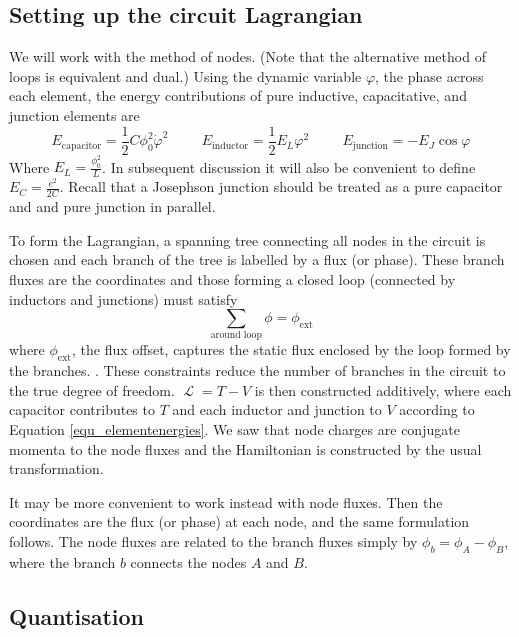 \documentclass[11pt]{article}
\DeclareMathOperator{\lagr}{\mathcal{L}}
\begin{document}
\subsection{Setting up the circuit Lagrangian}

We will work with the method of nodes. (Note that the alternative method of loops is equivalent and dual.) Using the dynamic variable $\varphi$, the phase across each element, the energy contributions of pure inductive, capacitative, and junction elements are 
\begin{equation}
E_\text{capacitor} = \frac{1}{2} C \phi_0^2 \dot{\varphi}^2
\hspace{1cm}
E_\text{inductor} = \frac{1}{2} E_L \varphi^2
\hspace{1cm}
E_\text{junction} = - E_J \cos{\varphi}
\label{equ_elementenergies}
\end{equation}
Where $E_L=\frac{\phi_0^2}{L}$. In subsequent discussion it will also be convenient to define $E_C = \frac{e^2}{2C}$. Recall that a Josephson junction should be treated as a pure capacitor and and pure junction in parallel.

To form the Lagrangian, a spanning tree connecting all nodes in the circuit is chosen and each branch of the tree is labelled by a flux (or phase). These branch fluxes are the coordinates and those forming a closed loop (connected by inductors and junctions) must satisfy
\begin{equation}
\sum_\text{around loop} \phi = \phi_\text{ext}
\end{equation}
where $\phi_\text{ext}$, the flux offset, captures the static flux enclosed by the loop formed by the branches. \cite{vool2017introduction}. These constraints reduce the number of branches in the circuit to the true degree of freedom. $\lagr = T - V$ is then constructed additively, where each capacitor contributes to $T$ and each inductor and junction to $V$ according to Equation \ref{equ_elementenergies}. We saw that node charges are conjugate momenta to the node fluxes and the Hamiltonian is constructed by the usual transformation.

It may be more convenient to work instead with node fluxes. Then the coordinates are the flux (or phase) at each node, and the same formulation follows. The node fluxes are related to the branch fluxes simply by $\phi_b = \phi_A - \phi_B$, where the branch $b$ connects the nodes $A$ and $B$.



\subsection{Quantisation}
\end{document}
